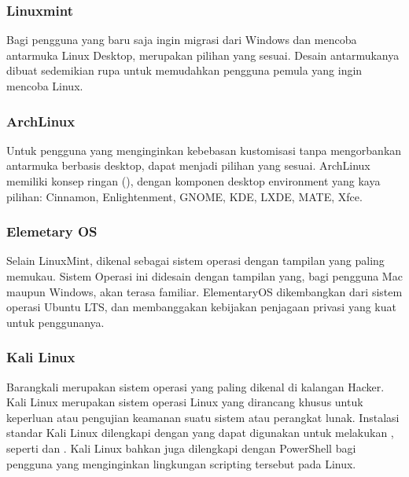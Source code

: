 \documentclass[letterpaper,10pt,english]{sphinxmanual}
\begin{document}


\subsubsection{Linuxmint}
\label{\detokenize{sesi1/pengantarlinux:linuxmint}}
Bagi pengguna yang baru saja ingin migrasi dari Windows dan mencoba antarmuka Linux Desktop,  merupakan pilihan yang sesuai. Desain antarmukanya dibuat sedemikian rupa untuk memudahkan pengguna pemula yang ingin mencoba Linux.


\subsubsection{ArchLinux}
\label{\detokenize{sesi1/pengantarlinux:archlinux}}
Untuk pengguna yang menginginkan kebebasan kustomisasi tanpa mengorbankan antarmuka berbasis desktop,  dapat menjadi pilihan yang sesuai. ArchLinux memiliki konsep ringan (), dengan komponen desktop environment yang kaya pilihan: Cinnamon, Enlightenment, GNOME, KDE, LXDE, MATE, Xfce.



\subsubsection{Elemetary OS}
\label{\detokenize{sesi1/pengantarlinux:elemetary-os}}
Selain LinuxMint,  dikenal sebagai sistem operasi dengan tampilan yang paling memukau. Sistem Operasi ini didesain dengan tampilan yang, bagi pengguna Mac maupun Windows, akan terasa familiar. ElementaryOS dikembangkan dari sistem operasi Ubuntu LTS, dan membanggakan kebijakan penjagaan privasi yang kuat untuk penggunanya.



\subsubsection{Kali Linux}
\label{\detokenize{sesi1/pengantarlinux:kali-linux}}
Barangkali  merupakan sistem operasi yang paling dikenal di kalangan Hacker. Kali Linux merupakan sistem operasi Linux yang dirancang khusus untuk keperluan  atau pengujian keamanan suatu sistem atau perangkat lunak. Instalasi standar Kali Linux dilengkapi dengan  yang dapat digunakan untuk melakukan , seperti  dan . Kali Linux bahkan juga dilengkapi dengan PowerShell bagi pengguna yang menginginkan lingkungan scripting tersebut pada Linux.
\end{document}

